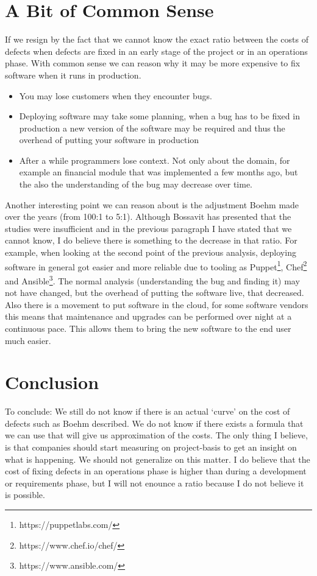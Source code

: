 \section*{A Bit of Common Sense}

If we resign by the fact that we cannot know the exact ratio between the costs of defects when defects are fixed in an early stage of the project or in an operations phase.
With common sense we can reason why it may be more expensive to fix software when it runs in production.

\begin{itemize}[noitemsep]
\item You may lose customers when they encounter bugs.
\item Deploying software may take some planning, when a bug has to be fixed in production a new version of the software may be required and thus the overhead of putting your software in production
\item After a while programmers lose context. Not only about the domain, for example an financial module that was implemented a few months ago, but the also the understanding of the bug may decrease over time.
\end{itemize}

Another interesting point we can reason about is the adjustment Boehm made over the years (from 100:1 to 5:1).
Although Bossavit has presented that the studies were insufficient and in the previous paragraph I have stated that we cannot know,
I do believe there is something to the decrease in that ratio.
For example, when looking at the second point of the previous analysis, deploying software in general got easier and more reliable due to tooling as Puppet\footnote{https://puppetlabs.com/}, Chef\footnote{https://www.chef.io/chef/} and Ansible\footnote{https://www.ansible.com/}.
The normal analysis (understanding the bug and finding it) may not have changed, but the overhead of putting the software live, that decreased.
Also there is a movement to put software in the cloud, for some software vendors this means that maintenance and upgrades can be performed over night at a continuous pace.
This allows them to bring the new software to the end user much easier.

\section*{Conclusion}

To conclude: We still do not know if there is an actual `curve' on the cost of defects such as Boehm described.
We do not know if there exists a formula that we can use that will give us approximation of the costs.
The only thing I believe, is that companies should start measuring on project-basis to get an insight on what is happening.
We should not generalize on this matter.
I do believe that the cost of fixing defects in an operations phase is higher than during a development or requirements phase,
but I will not enounce a ratio because I do not believe it is possible.